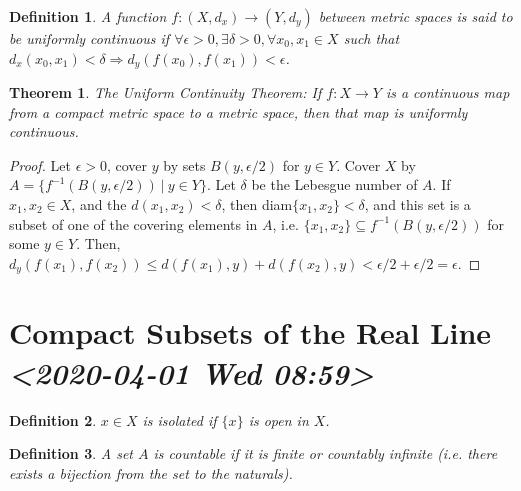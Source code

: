 \documentclass[11pt]{article}
\newtheorem{theorem}{Theorem}[section]
\newtheorem{definition}{Definition}[section]
\begin{document}
\begin{definition}
A function \(f:(X, d_x)\rightarrow (Y, d_y)\) between metric spaces is said to be
uniformly continuous if \(\forall \epsilon > 0, \exists \delta > 0, \forall x_0,
x_1 \in X\) such that \(d_x(x_0, x_1)<\delta\Rightarrow d_y(f(x_0), f(x_1)) <
\epsilon\). 
\end{definition}

\begin{theorem}
The Uniform Continuity Theorem: If \(f:X\rightarrow Y\) is a continuous map from a
compact metric space to a metric space, then that map is uniformly continuous. 
\end{theorem}

\begin{proof}
Let \(\epsilon > 0\), cover \(y\) by sets \(B(y, \epsilon/2)\) for \(y\in Y\). Cover \(X\)
by \(A = \{ f^{-1}(B(y, \epsilon/2))\ |\ y\in Y\}\). Let \(\delta\) be the Lebesgue
number of \(A\). If \(x_1, x_2\in X\), and the \(d(x_1, x_2) < \delta\), then
diam\(\{x_1, x_2\} < \delta\), and this set is a subset of one of the covering
elements in \(A\), i.e. \(\{x_1, x_2\} \subseteq f^{-1}(B(y, \epsilon/2))\) for some
\(y\in Y\). Then, \(d_y(f(x_1), f(x_2))\leq d(f(x_1), y) + d(f(x_2), y) <
\epsilon/2 + \epsilon/2 = \epsilon\).  
\end{proof}
\section{Compact Subsets of the Real Line \textit{<2020-04-01 Wed 08:59>}}
\label{sec:orgb853557}

\begin{definition}
\(x\in X\) is isolated if \(\{x\}\) is open in \(X\). 
\end{definition}

\begin{definition}
A set \(A\) is countable if it is finite or countably infinite (i.e. there exists
a bijection from the set to the naturals).  
\end{definition}
\end{document}
